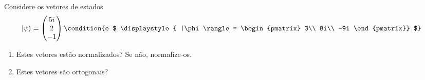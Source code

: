  \begin{prob}
	 Considere os vetores de estados
	 \begin{align} 
		 |\psi\rangle &=
		 \begin{pmatrix}
			 5i\\
			 2\\
			 -1
		 \end{pmatrix}\condition{e $
			 \displaystyle{
				 |\phi\rangle =
				 \begin{pmatrix}
					 3\\
					 8i\\
					 -9i									 
			 \end{pmatrix}}
		 $} 
	 \end{align}
	 \begin{enumerate}[label=\alph *)]
		 \item Estes vetores estão normalizados? Se não, normalize-os.
		 \item Estes vetores são ortogonais?
	 \end{enumerate}


\end{prob}

